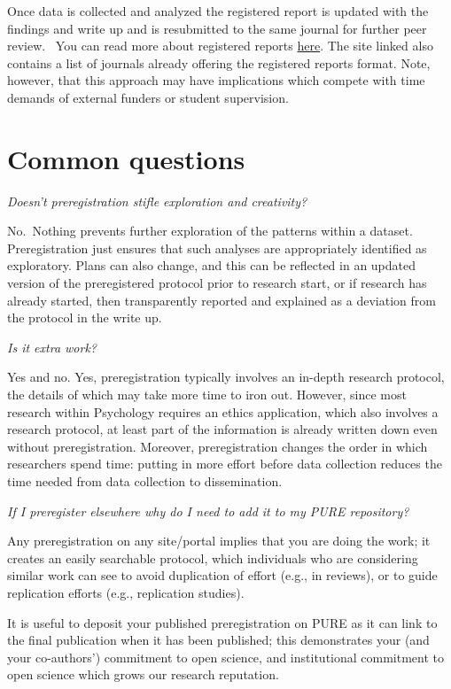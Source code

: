 \documentclass[
  letterpaper,
  DIV=11,
  numbers=noendperiod]{scrreprt}
\begin{document}
Once data is collected and analyzed the registered report is updated
with the findings and write up and is resubmitted to the same journal
for further peer review.~ You can read more about registered reports
\href{https://cos.io/rr/}{here}. The site linked also contains a list of
journals already offering the registered reports format. Note, however,
that this approach may have implications which compete with time demands
of external funders or student supervision.~

\hypertarget{common-questions}{%
\section{Common questions~}\label{common-questions}}

\emph{Doesn't preregistration stifle exploration and creativity?}~

No.~Nothing prevents further exploration of the patterns within a
dataset. Preregistration just ensures that such analyses are
appropriately identified as exploratory. Plans can also change, and this
can be reflected in an updated version of the preregistered protocol
prior to research start, or if research has already started, then
transparently reported and explained as a deviation from the protocol in
the write up.~

\emph{Is it extra work?}~

Yes and no. Yes, preregistration typically involves an in-depth research
protocol, the details of which may take more time to iron out. However,
since most research within Psychology requires an ethics application,
which also involves a research protocol, at least part of the
information is already written down even without preregistration.
Moreover, preregistration changes the order in which researchers spend
time: putting in more effort before data collection reduces the time
needed from data collection to dissemination.~

\emph{If I preregister elsewhere why do I need to add it to my PURE
repository?}~

Any preregistration on any site/portal implies that you are doing the
work; it creates an easily searchable protocol, which individuals who
are considering similar work can see to avoid duplication of effort
(e.g., in reviews), or to guide replication efforts (e.g., replication
studies).~

It is useful to deposit your published preregistration on PURE as it can
link to the final publication when it has been published; this
demonstrates your (and your co-authors') commitment to open science, and
institutional commitment to open science which grows our research
reputation.~
\end{document}
